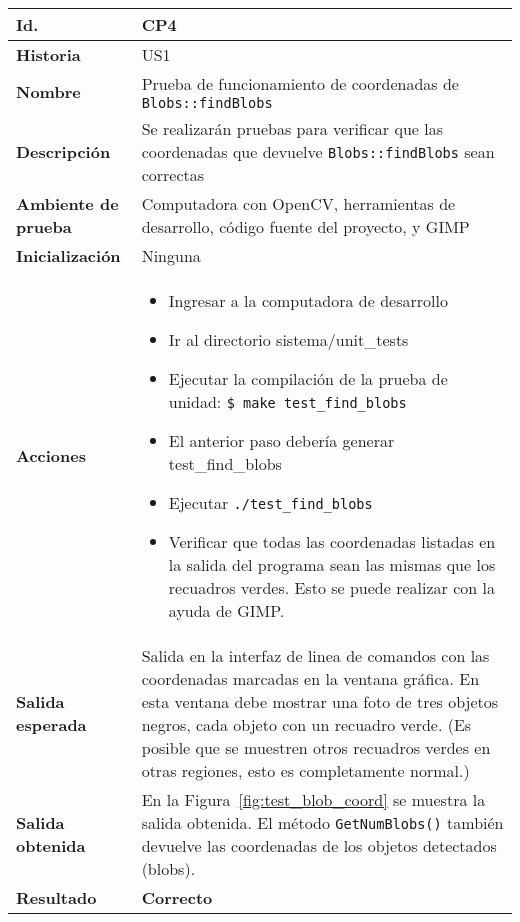 
\begin{longtable}{|l|p{10cm}|}
\hline
\textbf{Id.} & CP4 \\
\hline
\textbf{Historia} & US1\\
\hline
\textbf{Nombre} & Prueba de funcionamiento de coordenadas de \texttt{Blobs::findBlobs} \\
\hline
\textbf{Descripción} & Se realizarán pruebas para verificar que las coordenadas que devuelve \texttt{Blobs::findBlobs} sean correctas \\
\hline
\textbf{Ambiente de prueba} & Computadora con OpenCV, herramientas de desarrollo, código fuente del proyecto, y GIMP \\
\hline
\textbf{Inicialización} & Ninguna \\
\hline
\textbf{Acciones} &  
\parbox[][][s]{8cm}{ 
            \begin{itemize}
                \item Ingresar a la computadora de desarrollo
                \item Ir al directorio sistema/unit\_tests
                \item Ejecutar la compilación de la prueba de unidad: \texttt{\$ make test\_find\_blobs}
                \item El anterior paso debería generar test\_find\_blobs
                \item Ejecutar \texttt{./test\_find\_blobs}
                \item Verificar que todas las coordenadas listadas en la salida del programa sean las mismas que los recuadros verdes. Esto se puede realizar con la ayuda de GIMP.
            \end{itemize} 
}
\\
\hline
\textbf{Salida esperada} & Salida en la interfaz de linea de comandos con las coordenadas marcadas en la ventana gráfica. En esta ventana debe mostrar una foto de tres objetos negros, cada objeto con un recuadro verde. (Es posible que se muestren otros recuadros verdes en otras regiones, esto es completamente normal.)\\
\hline
\textbf{Salida obtenida} & En la Figura~\ref{fig:test_blob_coord} se muestra la salida obtenida. El método \texttt{GetNumBlobs()} también devuelve las coordenadas de los objetos detectados (blobs).\\
\hline
\textbf{Resultado} & \textbf{Correcto}\\
\hline
\end{longtable}

